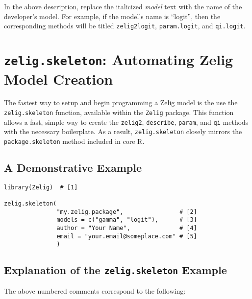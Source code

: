 \documentclass{article}
\newcommand{\code}[1]{{\tt #1}}
\begin{document}
In the above description, replace the italicized \emph{model} text with the name of the developer's model. For example, if the model's name is ``logit'', then the corresponding methods will be titled \code{zelig2logit}, \code{param.logit}, and \code{qi.logit}.



\section{\code{zelig.skeleton}: Automating Zelig Model Creation}\label{zelig.skeleton}

The fastest way to setup and begin programming a Zelig model is the use the \code{zelig.skeleton} function, available within the \code{Zelig} package. This function allows a fast, simple way to create the \code{zelig2}, \code{describe}, \code{param}, and \code{qi} methods with the necessary boilerplate. As a result, \code{zelig.skeleton} closely mirrors the \code{package.skeleton} method included in core R.

\subsection{A Demonstrative Example}

\begin{verbatim}
library(Zelig)  # [1]

zelig.skeleton(
               "my.zelig.package",                # [2]
               models = c("gamma", "logit"),      # [3]
               author = "Your Name",              # [4]
               email = "your.email@someplace.com" # [5]
               )
\end{verbatim}

\subsection{Explanation of the \code{zelig.skeleton} Example}

The above numbered comments correspond to the following:
\end{document}
